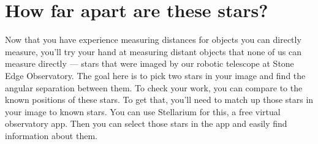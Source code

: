 %	
%	
%
%	
%	

\section{How far apart are these stars?}

Now that you have experience measuring distances for objects you can directly measure, you'll try your hand at measuring distant objects that none of us can measure directly --- stars that were imaged by our robotic telescope at Stone Edge Observatory.
The goal here is to pick two stars in your image and find the angular separation between them.
To check your work, you can compare to the known positions of these stars. To get that, you'll need to match up those stars in your image to known stars. You can use Stellarium for this, a free virtual observatory app. Then you can select those stars in the app and easily find information about them.

